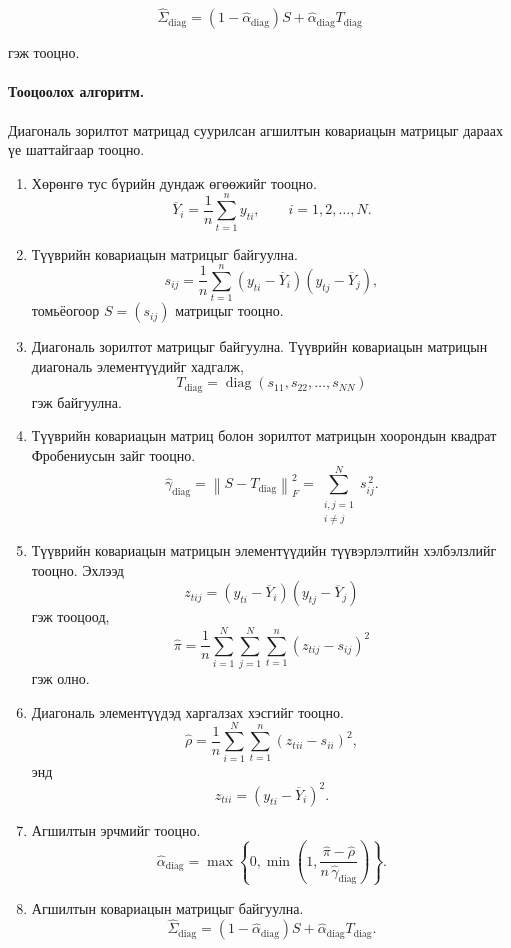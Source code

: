 \[
\widehat{\Sigma}_{\mathrm{diag}}
=
(1-\widehat{\alpha}_{\mathrm{diag}})S
+
\widehat{\alpha}_{\mathrm{diag}}T_{\mathrm{diag}}
\]

гэж тооцно.


\paragraph{Тооцоолох алгоритм.}

Диагональ зорилтот матрицад суурилсан агшилтын ковариацын матрицыг дараах үе шаттайгаар тооцно.

\begin{enumerate}
	\item Хөрөнгө тус бүрийн дундаж өгөөжийг тооцно.
	\[
	\overline{Y}_i
	=
	\frac{1}{n}
	\sum_{t=1}^{n}y_{ti},
	\qquad
	i=1,2,\ldots,N.
	\]
	
	\item Түүврийн ковариацын матрицыг байгуулна.
	\[
	s_{ij}
	=
	\frac{1}{n}
	\sum_{t=1}^{n}
	(y_{ti}-\overline{Y}_i)
	(y_{tj}-\overline{Y}_j),
	\]
	томьёогоор $S=(s_{ij})$ матрицыг тооцно.
	
	\item Диагональ зорилтот матрицыг байгуулна. Түүврийн ковариацын матрицын диагональ элементүүдийг хадгалж,
	\[
	T_{\mathrm{diag}}
	=
	\operatorname{diag}
	(s_{11},s_{22},\ldots,s_{NN})
	\]
	гэж байгуулна.
	
	\item Түүврийн ковариацын матриц болон зорилтот матрицын хоорондын квадрат Фробениусын зайг тооцно.
	\[
	\widehat{\gamma}_{\mathrm{diag}}
	=
	\left\|
	S-T_{\mathrm{diag}}
	\right\|_F^2
	=
	\sum_{\substack{i,j=1\\i\neq j}}^{N}s_{ij}^{\,2}.
	\]
	
	\item Түүврийн ковариацын матрицын элементүүдийн түүвэрлэлтийн хэлбэлзлийг тооцно. Эхлээд
	\[
	z_{tij}
	=
	(y_{ti}-\overline{Y}_i)
	(y_{tj}-\overline{Y}_j)
	\]
	гэж тооцоод,
	\[
	\widehat{\pi}
	=
	\frac{1}{n}
	\sum_{i=1}^{N}
	\sum_{j=1}^{N}
	\sum_{t=1}^{n}
	(z_{tij}-s_{ij})^2
	\]
	гэж олно.
	
	\item Диагональ элементүүдэд харгалзах хэсгийг тооцно.
	\[
	\widehat{\rho}
	=
	\frac{1}{n}
	\sum_{i=1}^{N}
	\sum_{t=1}^{n}
	(z_{tii}-s_{ii})^2,
	\]
	энд
	\[
	z_{tii}
	=
	(y_{ti}-\overline{Y}_i)^2.
	\]
	
	\item Агшилтын эрчмийг тооцно.
	\[
	\widehat{\alpha}_{\mathrm{diag}}
	=
	\max
	\left\{
	0,
	\min
	\left(
	1,
	\frac{\widehat{\pi}-\widehat{\rho}}
	{n\,\widehat{\gamma}_{\mathrm{diag}}}
	\right)
	\right\}.
	\]
	
	\item Агшилтын ковариацын матрицыг байгуулна.
	\[
	\widehat{\Sigma}_{\mathrm{diag}}
	=
	(1-\widehat{\alpha}_{\mathrm{diag}})S
	+
	\widehat{\alpha}_{\mathrm{diag}}T_{\mathrm{diag}}.
	\]
\end{enumerate}